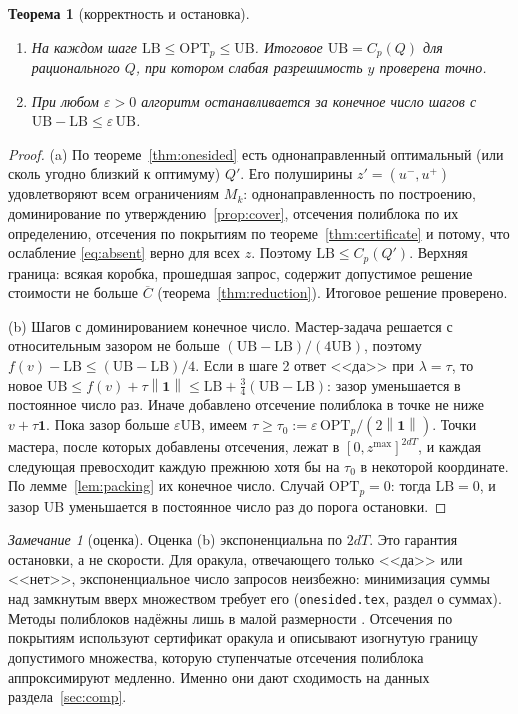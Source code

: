 \documentclass[a4paper,11pt]{article}
\theoremstyle{plain}
\newtheorem{theorem}{Теорема}[section]
\theoremstyle{definition}
\theoremstyle{remark}
\newtheorem*{remark}{Замечание}
\newcommand{\norm}[1]{\left\lVert #1 \right\rVert}
\newcommand{\OPT}{\mathrm{OPT}}
\newcommand{\LB}{\mathrm{LB}}
\newcommand{\UB}{\mathrm{UB}}
\begin{document}
\begin{theorem}[корректность и остановка]\label{thm:algo}
    \begin{enumerate}[label=(\alph*)]
        \item На каждом шаге $\LB\le\OPT_p\le\UB$. Итоговое $\UB=C_p(Q)$ для рационального $Q$, при котором слабая разрешимость $y$ проверена точно.
        \item При любом $\varepsilon>0$ алгоритм останавливается за конечное число шагов с $\UB-\LB\le\varepsilon\,\UB$.
    \end{enumerate}
\end{theorem}

\begin{proof}
    (a) По теореме~\ref{thm:onesided} есть однонаправленный оптимальный (или сколь угодно близкий к оптимуму) $Q'$. Его полуширины $z'=(u^-,u^+)$ удовлетворяют всем ограничениям $M_k$: однонаправленность по построению, доминирование по утверждению~\ref{prop:cover}, отсечения полиблока по их определению, отсечения по покрытиям по теореме~\ref{thm:certificate} и потому, что ослабление \eqref{eq:absent} верно для всех $z$. Поэтому $\LB\le C_p(Q')$. Верхняя граница: всякая коробка, прошедшая запрос, содержит допустимое решение стоимости не больше $\overline C$ (теорема~\ref{thm:reduction}). Итоговое решение проверено.

    (b) Шагов с доминированием конечное число. Мастер-задача решается с относительным зазором не больше $(\UB-\LB)/(4\UB)$, поэтому $f(v)-\LB\le(\UB-\LB)/4$. Если в шаге 2 ответ <<да>> при $\lambda=\tau$, то новое $\UB\le f(v)+\tau\norm{\mathbf1}\le\LB+\tfrac34(\UB-\LB)$: зазор уменьшается в постоянное число раз. Иначе добавлено отсечение полиблока в точке не ниже $v+\tau\mathbf1$. Пока зазор больше $\varepsilon\UB$, имеем $\tau\ge\tau_0:=\varepsilon\,\OPT_p/(2\norm{\mathbf1})$. Точки мастера, после которых добавлены отсечения, лежат в $[0,z^{\max}]^{2dT}$, и каждая следующая превосходит каждую прежнюю хотя бы на $\tau_0$ в некоторой координате. По лемме~\ref{lem:packing} их конечное число. Случай $\OPT_p=0$: тогда $\LB=0$, и зазор $\UB$ уменьшается в постоянное число раз до порога остановки.
\end{proof}

\begin{remark}[оценка]
    Оценка (b) экспоненциальна по $2dT$. Это гарантия остановки, а не скорости. Для оракула, отвечающего только <<да>> или <<нет>>, экспоненциальное число запросов неизбежно: минимизация суммы над замкнутым вверх множеством требует его (\texttt{onesided.tex}, раздел о суммах). Методы полиблоков надёжны лишь в малой размерности \cite{TuyAlKhayyalThach2005}. Отсечения по покрытиям используют сертификат оракула и описывают изогнутую границу допустимого множества, которую ступенчатые отсечения полиблока аппроксимируют медленно. Именно они дают сходимость на данных раздела~\ref{sec:comp}.
\end{remark}
\end{document}
